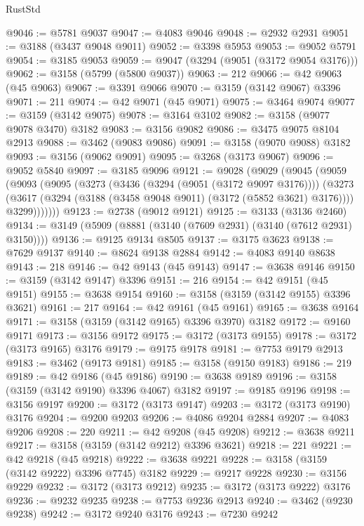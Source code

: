 \begin{lexlean}{RustStd}
\begin{coremodule}
@9046 := @5781 @9037
@9047 := @4083 @9046
@9048 := @2932 @2931
@9051 := @3188 (@3437 @9048 @9011)
@9052 := @3398 @5953
@9053 := @9052 @5791
@9054 := @3185 @9053
@9059 := @9047 (@3294 (@9051 (@3172 @9054 @3176)))
@9062 := @3158 (@5799 (@5800 @9037))
@9063 := 212
@9066 := @42 @9063 (@45 @9063)
@9067 := @3391 @9066
@9070 := @3159 (@3142 @9067) @3396
@9071 := 211
@9074 := @42 @9071 (@45 @9071)
@9075 := @3464 @9074
@9077 := @3159 (@3142 @9075)
@9078 := @3164 @3102
@9082 := @3158 (@9077 @9078 @3470) @3182
@9083 := @3156 @9082
@9086 := @3475 @9075 @8104 @2913
@9088 := @3462 (@9083 @9086)
@9091 := @3158 (@9070 @9088) @3182
@9093 := @3156 (@9062 @9091)
@9095 := @3268 (@3173 @9067)
@9096 := @9052 @5840
@9097 := @3185 @9096
@9121 := @9028
    (@9029
      (@9045
        (@9059
          (@9093
            (@9095
              (@3273
                (@3436 (@3294 (@9051 (@3172 @9097 @3176))))
                (@3273
                  (@3617 (@3294 (@3188 (@3458 @9048 @9011) (@3172 (@5852 @3621) @3176))))
                  @3299)))))))
@9123 := @2738 (@9012 @9121)
@9125 := @3133 (@3136 @2460)
@9134 := @3149 (@5909 (@8881 (@3140 (@7609 @2931) (@3140 (@7612 @2931) @3150))))
@9136 := @9125 @9134 @8505
@9137 := @3175 @3623
@9138 := @7629 @9137
@9140 := @8624 @9138 @2884
@9142 := @4083 @9140 @8638
@9143 := 218
@9146 := @42 @9143 (@45 @9143)
@9147 := @3638 @9146
@9150 := @3159 (@3142 @9147) @3396
@9151 := 216
@9154 := @42 @9151 (@45 @9151)
@9155 := @3638 @9154
@9160 := @3158 (@3159 (@3142 @9155) @3396 @3621)
@9161 := 217
@9164 := @42 @9161 (@45 @9161)
@9165 := @3638 @9164
@9171 := @3158 (@3159 (@3142 @9165) @3396 @3970) @3182
@9172 := @9160 @9171
@9173 := @3156 @9172
@9175 := @3172 (@3173 @9155)
@9178 := @3172 (@3173 @9165) @3176
@9179 := @9175 @9178
@9181 := @7753 @9179 @2913
@9183 := @3462 (@9173 @9181)
@9185 := @3158 (@9150 @9183)
@9186 := 219
@9189 := @42 @9186 (@45 @9186)
@9190 := @3638 @9189
@9196 := @3158 (@3159 (@3142 @9190) @3396 @4067) @3182
@9197 := @9185 @9196
@9198 := @3156 @9197
@9200 := @3172 (@3173 @9147)
@9203 := @3172 (@3173 @9190) @3176
@9204 := @9200 @9203
@9206 := @4086 @9204 @2884
@9207 := @4083 @9206
@9208 := 220
@9211 := @42 @9208 (@45 @9208)
@9212 := @3638 @9211
@9217 := @3158 (@3159 (@3142 @9212) @3396 @3621)
@9218 := 221
@9221 := @42 @9218 (@45 @9218)
@9222 := @3638 @9221
@9228 := @3158 (@3159 (@3142 @9222) @3396 @7745) @3182
@9229 := @9217 @9228
@9230 := @3156 @9229
@9232 := @3172 (@3173 @9212)
@9235 := @3172 (@3173 @9222) @3176
@9236 := @9232 @9235
@9238 := @7753 @9236 @2913
@9240 := @3462 (@9230 @9238)
@9242 := @3172 @9240 @3176
@9243 := @7230 @9242

\end{coremodule}
\end{lexlean}
